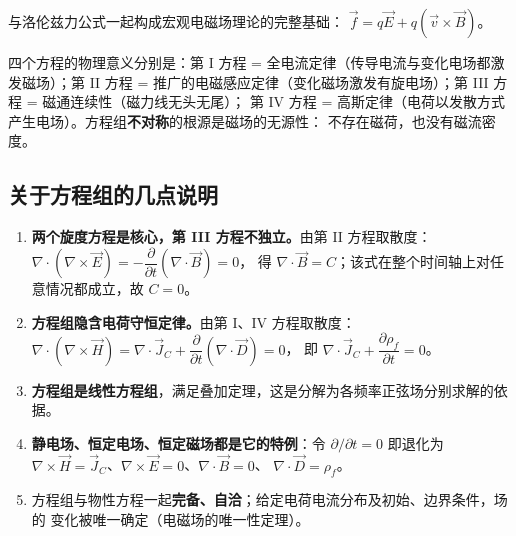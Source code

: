 与洛伦兹力公式一起构成宏观电磁场理论的完整基础：
$\vec{f}=q\vec{E}+q(\vec{v}\times\vec{B})$。

四个方程的物理意义分别是：第 I 方程 = 全电流定律（传导电流与变化电场都激发磁场）；第 II 方程
= 推广的电磁感应定律（变化磁场激发有旋电场）；第 III 方程 = 磁通连续性（磁力线无头无尾）；
第 IV 方程 = 高斯定律（电荷以发散方式产生电场）。方程组\textbf{不对称}的根源是磁场的无源性：
不存在磁荷，也没有磁流密度。

\subsection{关于方程组的几点说明}

\begin{enumerate}
  \item \textbf{两个旋度方程是核心，第 III 方程不独立。}由第 II 方程取散度：
  $\nabla\cdot(\nabla\times\vec{E})=-\dfrac{\partial}{\partial t}(\nabla\cdot\vec{B})=0$，
  得 $\nabla\cdot\vec{B}=C$；该式在整个时间轴上对任意情况都成立，故 $C=0$。

  \item \textbf{方程组隐含电荷守恒定律。}由第 I、IV 方程取散度：
  $\nabla\cdot(\nabla\times\vec{H})=\nabla\cdot\vec{J}_C
  +\dfrac{\partial}{\partial t}(\nabla\cdot\vec{D})=0$，
  即 $\nabla\cdot\vec{J}_C+\dfrac{\partial\rho_f}{\partial t}=0$。

  \item \textbf{方程组是线性方程组}，满足叠加定理，这是分解为各频率正弦场分别求解的依据。

  \item \textbf{静电场、恒定电场、恒定磁场都是它的特例}：令 $\partial/\partial t=0$ 即退化为
  $\nabla\times\vec{H}=\vec{J}_C$、$\nabla\times\vec{E}=0$、$\nabla\cdot\vec{B}=0$、
  $\nabla\cdot\vec{D}=\rho_f$。

  \item 方程组与物性方程一起\textbf{完备、自洽}；给定电荷电流分布及初始、边界条件，场的
  变化被唯一确定（电磁场的唯一性定理）。


\end{enumerate}
